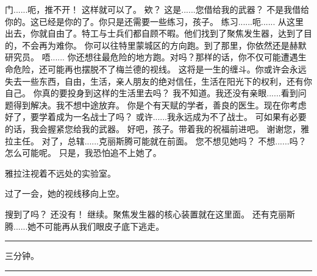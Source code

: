 \documentclass[openany]{book}
\begin{document}
\begin{dialogue}
     门......呃，推不开！
     这样就可以了。
     欸？
     这是......您借给我的武器？
     不是我借给你的。这已经是你的了。你只是还需要一些练习，孩子。
     练习......呃......
     从这里出去，你就自由了。特工与士兵们都自顾不暇。他们找到了聚焦发生器，达到了目的，不会再为难你。
     你可以往特里蒙城区的方向跑。到了那里，你依然还是赫默研究员。
     唔......
     你还想往最危险的地方跑。对吗？那样的话，你不仅可能遭遇生命危险，还可能再也摆脱不了梅兰德的视线。
     这将是一生的缠斗。你或许会永远失去一些东西，自由，生活，亲人朋友的绝对信任，生活在阳光下的权利，还有你自己。
     你真的要投身到这样的生活里去吗？
     我不知道。我还没有亲眼......看到问题得到解决。我不想中途放弃。
     你是个有天赋的学者，善良的医生。现在你考虑好了，要学着成为一名战士了吗？
     或许......我永远成为不了战士。
     可如果有必要的话，我会握紧您给我的武器。
     好吧，孩子。带着我的祝福前进吧。
     谢谢您，雅拉主任。
     对了，总辖......克丽斯腾可能就在前面。
     您不想见她吗？
     不想......吗？怎么可能呢。
     只是，我恐怕追不上她了。
\end{dialogue}
\par
雅拉注视着不远处的实验室。\par
过了一会，她的视线移向上空。

\begin{dialogue}
     搜到了吗？
     还没有！
     继续。聚焦发生器的核心装置就在这里面。
     还有克丽斯腾......她不可能再从我们眼皮子底下逃走。
\end{dialogue}

\par\noindent\rule{\textwidth}{0.4pt}
三分钟。
\par\noindent\rule{\textwidth}{0.4pt}
\end{document}
